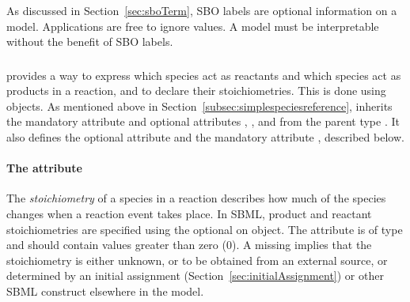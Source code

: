As discussed in Section~\ref{sec:sboTerm}, SBO labels are optional
information on a model.  Applications are free to ignore
 values.  A model must be interpretable without the
benefit of SBO labels.


\subsubsection{}
\label{subsec:speciesreference}

\Reaction provides a way to express which species act as reactants
and which species act as products in a reaction, and to declare
their stoichiometries.  This is done using \SpeciesReference
objects.  As mentioned above in
Section~\ref{subsec:simplespeciesreference}, \SpeciesReference
inherits the mandatory attribute  and optional
attributes , , and  from the
parent type \SimpleSpeciesReference.  It also defines the optional
attribute  and the mandatory attribute
, described below.


\paragraph{The  attribute}

The {\em stoichiometry} of a species in a reaction describes how
much of the species changes when a reaction event takes place.  In
SBML, product and reactant stoichiometries are specified using the
optional  on \SpeciesReference object.  The
 attribute is of type  and
should contain values greater than zero (0).  A missing
 implies that the stoichiometry is either
unknown, or to be obtained from an external source, or determined
by an initial assignment (Section~\ref{sec:initialAssignment}) or
other SBML construct elsewhere in the model.

